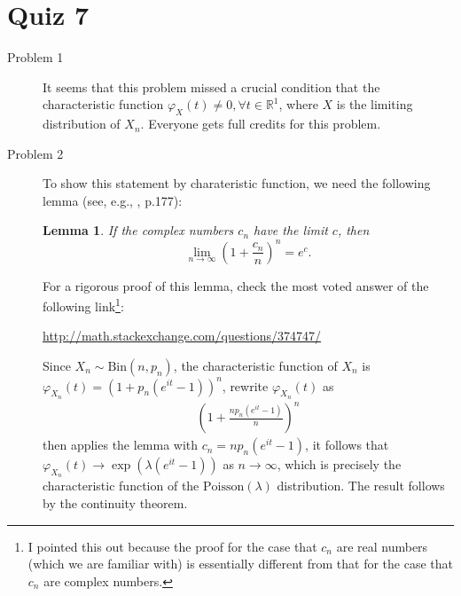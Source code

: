 \documentclass{article}
\newcommand{\real}{\mathbb{R}}
\theoremstyle{definition}
\theoremstyle{plain}
\newtheorem*{lem}{Lemma}
\theoremstyle{remark}
\begin{document}
\section*{Quiz 7}
\begin{description}
\item[Problem 1] It seems that this problem missed a crucial condition
that the characteristic function $\varphi_X(t) \neq 0, \forall t \in 
\real^1$, where $X$ is the limiting distribution of $X_n$. Everyone
gets full credits for this problem.

\item[Problem 2] To show this statement by charateristic function, we need the following 
lemma (see, e.g., \cite{chung2001probability}, p.177):
\begin{lem}
If the complex numbers $c_n$ have the limit $c$, then
\begin{equation*}
    \lim_{n \to \infty} \left(1 + \frac{c_n}{n}\right)^n = e^c.
\end{equation*}
\end{lem}
For a rigorous proof of this lemma, check the most voted answer of the following link\footnote{I pointed this out because the proof for the case that $c_n$ are real numbers (which we are familiar with) is essentially different from that for the case that $c_n$ are complex numbers.}:

\url{http://math.stackexchange.com/questions/374747/}

Since $X_n \sim \text{Bin}(n, p_n)$, the characteristic function of $X_n$ is 
$\varphi_{X_n}(t) = (1 + p_n(e^{it} - 1))^n$, rewrite $\varphi_{X_n}(t)$ as
\begin{align*}
    \left(1 + \frac{np_n(e^{it} - 1)}{n}\right)^n
\end{align*}
then applies the lemma with $c_n = np_n(e^{it} - 1)$, it follows that
$\varphi_{X_n}(t) \to \exp(\lambda(e^{it} - 1))$ as $n \to \infty$, which is precisely the
characteristic function of the $\text{Poisson}(\lambda)$ distribution. The result follows
by the continuity theorem. 
\end{description}

\newpage
\end{document}
